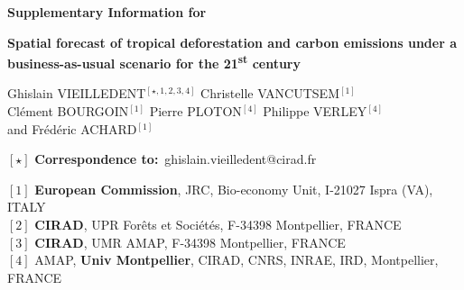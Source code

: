 
\begin{center}
  \Large{\textbf{Supplementary Information for}}
\end{center}

\vspace{1cm}

\begin{center}
  \LARGE{\textbf{\textcolor{pinpblue}{Spatial forecast of tropical deforestation and carbon emissions under a business-as-usual scenario for the 21\textsuperscript{st} century}}}
\end{center}

\vspace{1cm}

\begin{center}
  \large{
  Ghislain VIEILLEDENT$^{[\star, 1, 2, 3, 4]}$ \hspace{0.5cm} Christelle VANCUTSEM$^{[1]}$\\
  \vspace{0.5cm}
  Clément BOURGOIN$^{[1]}$ \hspace{0.5cm} Pierre PLOTON$^{[4]}$ \hspace{0.5cm} Philippe VERLEY$^{[4]}$\\
  \vspace{0.5cm}
  and \hspace{0.5cm} Frédéric ACHARD$^{[1]}$
  }
\end{center}

\vspace{0.5cm}

\begin{center}
  $[\star]$ \textbf{Correspondence to:}~ghislain.vieilledent@cirad.fr\\
\end{center}

\vspace{0.5cm}

{\small
  \begin{flushleft}
    $[1]$ \textbf{European Commission}, JRC, Bio-economy Unit, I-21027 Ispra (VA), ITALY\\
    $[2]$ \textbf{CIRAD}, UPR Forêts et Sociétés, F-34398 Montpellier, FRANCE\\
    $[3]$ \textbf{CIRAD}, UMR AMAP, F-34398 Montpellier, FRANCE\\
    $[4]$ AMAP, \textbf{Univ Montpellier}, CIRAD, CNRS, INRAE, IRD, Montpellier, FRANCE\\
  \end{flushleft}}

